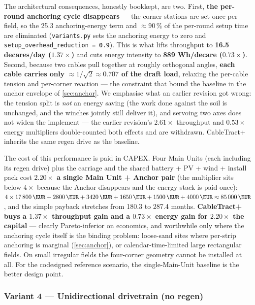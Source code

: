 \documentclass[11pt,a4paper]{article}
\begin{document}
The architectural consequences, honestly bookkept, are two. First, \textbf{the per-round anchoring cycle disappears} --- the corner stations are set once per field, so the \SI{25.3}{\Wh} anchoring-energy term and ${\approx}90\,\%$ of the per-round setup time are eliminated (\texttt{variants.py} sets the anchoring energy to zero and \texttt{setup\_overhead\_reduction = 0.9}). This is what lifts throughput to \textbf{16.5 decares/day ($1.37\times$)} and cuts energy intensity to \textbf{889 Wh/decare ($0.73\times$)}. Second, because two cables pull together at roughly orthogonal angles, \textbf{each cable carries only ${\approx}1/\sqrt{2} \approx 0.707$ of the draft load}, relaxing the per-cable tension and per-corner reaction --- the constraint that bound the baseline in the anchor envelope of \cref{sec:anchor}. We emphasise what an earlier revision got wrong: the tension split is \emph{not} an energy saving (the work done against the soil is unchanged, and the winches jointly still deliver it), and servoing two axes does not widen the implement --- the earlier revision's $2.61\times$ throughput and $0.53\times$ energy multipliers double-counted both effects and are withdrawn. CableTract+ inherits the same regen drive as the baseline.

The cost of this performance is paid in CAPEX. Four Main Units (each including its regen drive) plus the carriage and the shared battery + PV + wind + install pack cost \textbf{$2.20\times$ a single Main Unit + Anchor pair} (the multiplier sits below $4\times$ because the Anchor disappears and the energy stack is paid once): $4 \times \SI{17800}{\EUR} + \SI{2800}{\EUR} + \SI{3420}{\EUR} + \SI{1650}{\EUR} + \SI{1500}{\EUR} + \SI{4000}{\EUR} \approx \SI{85000}{\EUR}$, and the simple payback stretches from 180.3 to 287.4 months. \textbf{CableTract+ buys a $1.37\times$ throughput gain and a $0.73\times$ energy gain for $2.20\times$ the capital} --- clearly Pareto-inferior on economics, and worthwhile only where the anchoring cycle itself is the binding problem: loose-sand sites where per-strip anchoring is marginal (\cref{sec:anchor}), or calendar-time-limited large rectangular fields. On small irregular fields the four-corner geometry cannot be installed at all. For the codesigned reference scenario, the single-Main-Unit baseline is the better design point.

\subsubsection{Variant 4 --- Unidirectional drivetrain (no regen)}\label{sec:variant-norering}
\end{document}
